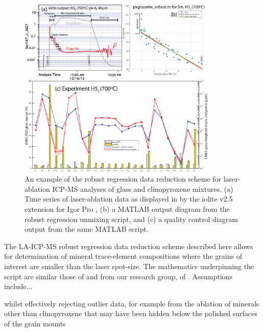 \begin{figure}[htb]
\begin{center}
\includegraphics[width=0.85\textwidth]{S4_QAQC_LaserMix_H5_2}
\caption[An example of the robust regression data reduction scheme for laser-ablation ICP-MS analyses of glass and clinopyroxene mixtures.]
    {An example of the robust regression data reduction scheme for laser-ablation ICP-MS analyses of glass and clinopyroxene mixtures. (a) Time series of laser-ablation data as displayed in by the iolite v2.5 extension for Igor Pro \citep{Paton2011}, (b) a MATLAB output diagram from the robust regression unmixing script, and (c) a quality control diagram output from the same MATLAB script. %
    }
    \label{LaserMixFig}
\end{center}
\end{figure}

The LA-ICP-MS robust regression data reduction scheme described here allows for determination of mineral trace-element compositions where the grains of interest are smaller than the laser spot-size. The mathematics underpinning the script are similar those of \citet{Rubatto2007} and from our research group, of \citet{Yang2018}. 
Assumptions include...

		whilst effectively rejecting outlier data, for example from the ablation of minerals other than clinopyroxene that may have been hidden below the polished surfaces of the grain mounts




